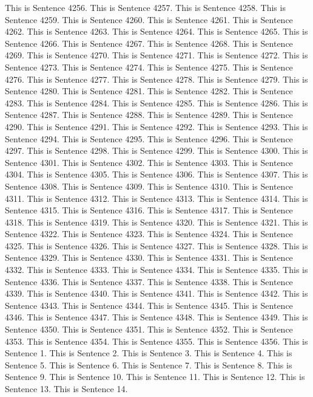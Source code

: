 \documentclass{article}
\begin{document}
This is Sentence 4256.
This is Sentence 4257.
This is Sentence 4258.
This is Sentence 4259.
This is Sentence 4260.
This is Sentence 4261.
This is Sentence 4262.
This is Sentence 4263.
This is Sentence 4264.
This is Sentence 4265.
This is Sentence 4266.
This is Sentence 4267.
This is Sentence 4268.
This is Sentence 4269.
This is Sentence 4270.
This is Sentence 4271.
This is Sentence 4272.
This is Sentence 4273.
This is Sentence 4274.
This is Sentence 4275.
This is Sentence 4276.
This is Sentence 4277.
This is Sentence 4278.
This is Sentence 4279.
This is Sentence 4280.
This is Sentence 4281.
This is Sentence 4282.
This is Sentence 4283.
This is Sentence 4284.
This is Sentence 4285.
This is Sentence 4286.
This is Sentence 4287.
This is Sentence 4288.
This is Sentence 4289.
This is Sentence 4290.
This is Sentence 4291.
This is Sentence 4292.
This is Sentence 4293.
This is Sentence 4294.
This is Sentence 4295.
This is Sentence 4296.
This is Sentence 4297.
This is Sentence 4298.
This is Sentence 4299.
This is Sentence 4300.
This is Sentence 4301.
This is Sentence 4302.
This is Sentence 4303.
This is Sentence 4304.
This is Sentence 4305.
This is Sentence 4306.
This is Sentence 4307.
This is Sentence 4308.
This is Sentence 4309.
This is Sentence 4310.
This is Sentence 4311.
This is Sentence 4312.
This is Sentence 4313.
This is Sentence 4314.
This is Sentence 4315.
This is Sentence 4316.
This is Sentence 4317.
This is Sentence 4318.
This is Sentence 4319.
This is Sentence 4320.
This is Sentence 4321.
This is Sentence 4322.
This is Sentence 4323.
This is Sentence 4324.
This is Sentence 4325.
This is Sentence 4326.
This is Sentence 4327.
This is Sentence 4328.
This is Sentence 4329.
This is Sentence 4330.
This is Sentence 4331.
This is Sentence 4332.
This is Sentence 4333.
This is Sentence 4334.
This is Sentence 4335.
This is Sentence 4336.
This is Sentence 4337.
This is Sentence 4338.
This is Sentence 4339.
This is Sentence 4340.
This is Sentence 4341.
This is Sentence 4342.
This is Sentence 4343.
This is Sentence 4344.
This is Sentence 4345.
This is Sentence 4346.
This is Sentence 4347.
This is Sentence 4348.
This is Sentence 4349.
This is Sentence 4350.
This is Sentence 4351.
This is Sentence 4352.
This is Sentence 4353.
This is Sentence 4354.
This is Sentence 4355.
This is Sentence 4356.
This is Sentence 1.
This is Sentence 2.
This is Sentence 3.
This is Sentence 4.
This is Sentence 5.
This is Sentence 6.
This is Sentence 7.
This is Sentence 8.
This is Sentence 9.
This is Sentence 10.
This is Sentence 11.
This is Sentence 12.
This is Sentence 13.
This is Sentence 14.
\end{document}
